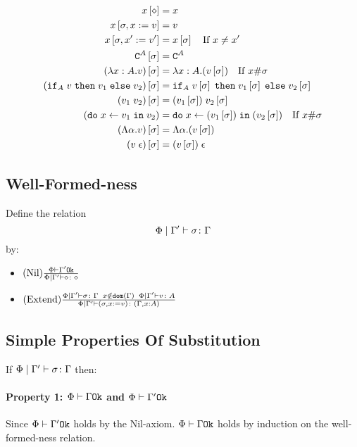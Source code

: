 {        
        \begin{align}
            x\left[\diamond\right] & = x \\
            x\left[\sigma,x:= v\right] & = v \\
            x\left[\sigma,x':= v'\right] & = x\left[\sigma\right]\quad\text{If }x \neq x'\\
            \texttt{C}^{A}\left[\sigma\right] & = \texttt{C}^{A} \\
            (\lambda x : A. v)\left[\sigma\right] &= \lambda x : A. (v\left[\sigma\right])\quad\text{If }x\#\sigma\\
            (\texttt{if}_{A}\; v\; \texttt{then}\; v_1 \;\texttt{else} \; v_2)\left[\sigma\right] &= \texttt{if}_{A}\; v\left[\sigma\right]\; \texttt{then}\; v_1\left[\sigma\right] \;\texttt{else} \; v_2\left[\sigma\right]\\
            (v_1\; v_2)\left[\sigma\right]&= (v_1\left[\sigma\right])\; v_2\left[\sigma\right]\\
            (\texttt{do}\; x \leftarrow v_1 \;\texttt{in}\; v_2)&= \texttt{do}\; x \leftarrow (v_1\left[\sigma\right]) \;\texttt{in}\; (v_2\left[\sigma\right])\quad\text{If } x\#\sigma\\
            (\Lambda \alpha. v)\left[\sigma\right] & = \Lambda \alpha. (v\left[\sigma\right])\\
            (v\;\epsilon)\left[\sigma\right] & = (v\left[\sigma\right])\;\epsilon\\
        \end{align}
        \subsection{Well-Formed-ness}
    Define the relation $$\Phi\mid\Gamma' \vdash \sigma \colon \Gamma$$ by:

    \begin{itemize}
        \item $(\text{Nil}) \frac{\Phi\vdash \Gamma' \texttt{Ok}}{\Phi\mid\Gamma' \vdash \diamond \colon \diamond}$
        \item $(\text{Extend}) \frac{
            \Phi\mid\Gamma' \vdash \sigma \colon \Gamma
            \;\;
            x\notin\texttt{dom}(\Gamma)
            \;\;
            \Phi\mid\Gamma' \vdash v \colon A
        }{
            \Phi\mid\Gamma' \vdash (\sigma, x := v) \colon (\Gamma, x: A)
        }$
    \end{itemize}
    \subsection{Simple Properties Of Substitution}
    If $\Phi\mid\Gamma' \vdash \sigma \colon \Gamma$ then:

        \paragraph{Property 1: $\Phi\vdash \Gamma \texttt{Ok}$ and $\Phi\vdash \Gamma' \texttt{Ok}$}
         Since $\Phi\vdash \Gamma' \texttt{Ok}$ holds by the Nil-axiom. $\Phi\vdash \Gamma \texttt{Ok}$ holds by induction on the well-formed-ness relation.
}
